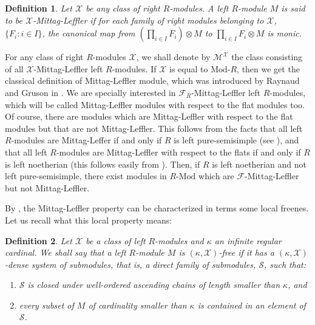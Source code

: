 \documentclass[a4paper,10pt]{amsart}
\newtheorem{definition}{Definition}[section]
\begin{document}
\begin{definition}\label{d:ML}
  Let $\mathcal X$ be any class of right $R$-modules. A left
  $R$-module $M$ is said to be $\mathcal X$-Mittag-Leffler if for each
  family of right modules belonging to $\mathcal X$, $\{F_i:i \in
  I\}$, the canonical map from $\left(\prod_{i \in I}F_i\right)
  \otimes M$ to $\prod_{i \in I}F_i \otimes M$ is monic.
\end{definition}

For any class of right $R$-modules $\mathcal X$, we shall denote by
$\mathcal M^{\mathcal X}$ the class consisting of all $\mathcal
X$-Mittag-Leffler left $R$-modules. If $\mathcal X$ is equal to
${\textrm{Mod-}R}$, then we get the classical definition of
Mittag-Leffler module, which was introduced by Raynaud and Gruson in
\cite{RaynaudGruson}.  We are specially interested in $\mathcal
F_R$-Mittag-Leffler left $R$-modules, which will be called Mittag-Leffler modules
with respect to the flat modules too. Of course, there are modules
which are Mittag-Leffler with respect to the flat modules but that are
not Mittag-Leffler. This follows from the facts that all left $R$-modules
are Mittag-Leffer if and only if $R$ is left pure-semisimple (see
\cite[Theorem 8]{AzumayaFacchini}), and that all left $R$-modules are
Mittag-Leffler with respect to the flats if and only if $R$ is left
noetherian (this follows easily from \cite[Theorem
1]{goodearl}). Then, if $R$ is left noetherian and not left
pure-semisimple, there exist modules in ${R\textrm{-Mod}}$ which are
$\mathcal F$-Mittag-Leffler but not Mittag-Leffler.

By \cite[Theorem 2.6]{HerberaTrlifaj}, the Mittag-Leffler property can be
characterized in terms some local freenes. Let us recall what this
local property means:

\begin{definition}\label{d:LocalFree}
  Let $\mathcal X$ be a class of left $R$-modules and $\kappa$ an
  infinite regular cardinal. We shall say that a left $R$-module $M$ is
  $(\kappa,\mathcal X)$-free if it has a $(\kappa,\mathcal X)$-dense
  system of submodules, that is, a direct family of submodules,
  $\mathcal S$, such that:

  \begin{enumerate}
  \item $\mathcal S$ is closed under well-ordered ascending chains of
    length smaller than $\kappa$, and

  \item every subset of $M$ of cardinality smaller than $\kappa$ is
    contained in an element of $\mathcal S$.
  \end{enumerate}
\end{definition}
\end{document}
